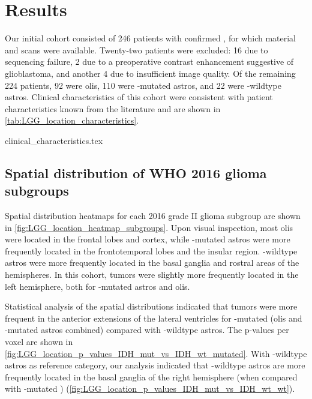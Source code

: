 \section{Results}

Our initial cohort consisted of \num{246} patients with confirmed , for which  material and  scans were available.
Twenty-two patients were excluded: \num{16} due to sequencing failure, \num{2} due to a preoperative contrast enhancement suggestive of \gls{glioblastoma}, and another 4 due to insufficient image quality.
Of the remaining \num{224} patients, \num{92} were \glspl{oli}, \num{110} were -mutated \glspl{astro}, and 22 were -wildtype \glspl{astro}.
Clinical characteristics of this cohort were consistent with  patient characteristics known from the literature and are shown in \cref{tab:LGG_location_characteristics}.

{clinical_characteristics.tex}

\subsection{Spatial distribution of WHO 2016 glioma subgroups}

Spatial distribution heatmaps for each  2016 grade II glioma subgroup are shown in \cref{fig:LGG_location_heatmap_subgroups}.
Upon visual inspection, most \glspl{oli} were located in the frontal lobes and cortex, while -mutated \glspl{astro} were more frequently located in the frontotemporal lobes and the insular region.
-wildtype \glspl{astro} were more frequently located in the basal ganglia and rostral areas of the hemispheres.
In this cohort, \glspl{tumor} were slightly more frequently located in the left hemisphere, both for -mutated \glspl{astro} and \glspl{oli}.

Statistical analysis of the spatial distributions indicated that \glspl{tumor} were more frequent in the anterior extensions of the lateral ventricles for -mutated  (\glspl{oli} and -mutated \glspl{astro} combined) compared with -wildtype \glspl{astro}.
The p-values per voxel are shown in \cref{fig:LGG_location_p_values_IDH_mut_vs_IDH_wt_mutated}.
With -wildtype \glspl{astro} as reference category, our analysis indicated that -wildtype \glspl{astro} are more frequently located in the basal ganglia of the right hemisphere (when compared with -mutated ) (\cref{fig:LGG_location_p_values_IDH_mut_vs_IDH_wt_wt}).

